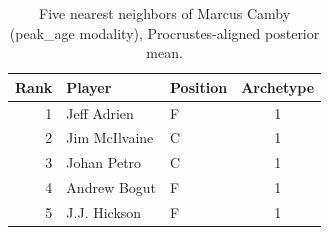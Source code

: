 \begin{table}[htbp]
  \centering\small
  \begin{tabular}{rllc}
    \toprule
    Rank & Player & Position & Archetype \\
    \midrule
    1 & Jeff Adrien & F & 1 \\
    2 & Jim McIlvaine & C & 1 \\
    3 & Johan Petro & C & 1 \\
    4 & Andrew Bogut & F & 1 \\
    5 & J.J. Hickson & F & 1 \\
    \bottomrule
  \end{tabular}
  \caption{Five nearest neighbors of Marcus Camby (peak_age modality), Procrustes-aligned posterior mean.}
  \label{tab:Marcus_Camby_neighbors_peak_age}
\end{table}

